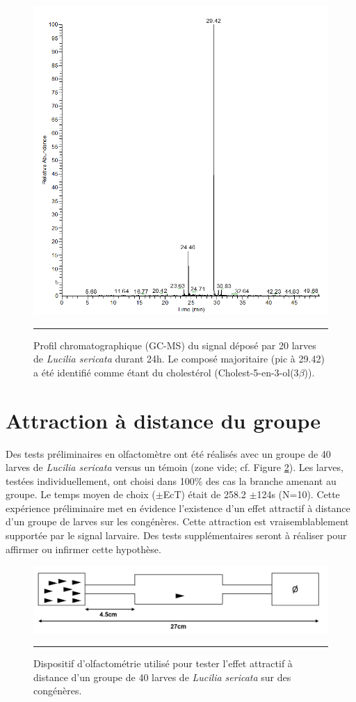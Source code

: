 \begin{figure}[ht]
\centering
		\includegraphics[width=0.8 \textwidth]{Figures/chromato.png}
		\rule{35em}{0.5pt}
		\caption[Chromato]{Profil chromatographique (GC-MS) du signal déposé par 20 larves de \textit{Lucilia sericata} durant 24h. Le composé majoritaire (pic à 29.42) a été identifié comme étant du cholestérol (Cholest-5-en-3-ol(3$\beta$)).}
	\label{fig:chromato}
    
\end{figure}

\section{Attraction à distance du groupe}
Des tests préliminaires en olfactomètre ont été réalisés avec un groupe de 40 larves de \textit{Lucilia sericata} versus un témoin (zone vide; cf. Figure \ref{fig:olfacto}). Les larves, testées individuellement, ont choisi dans 100$\%$ des cas la branche amenant au groupe. Le temps moyen de choix ($\pm$EcT) était de 258.2 $\pm$124s (N=10). Cette expérience préliminaire met en évidence l'existence d'un effet attractif à distance d'un groupe de larves sur les congénères. Cette attraction est vraisemblablement supportée par le signal larvaire. Des tests supplémentaires seront à réaliser pour affirmer ou infirmer cette hypothèse.

\begin{figure}[ht]
\centering
		\includegraphics[width=0.8 \textwidth]{Figures/olfacto.png}
		\rule{35em}{0.5pt}
		\caption[Olfacto]{Dispositif d'olfactométrie utilisé pour tester l'effet attractif à distance d'un groupe de 40 larves de \textit{Lucilia sericata} sur des congénères.}
	\label{fig:olfacto}
    
\end{figure}
 
 
 
 
 
